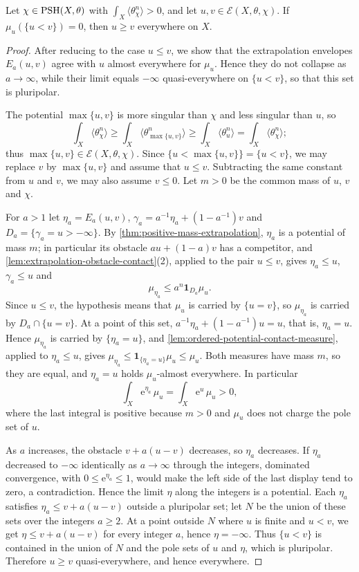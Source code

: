 \begin{theorem}\label{thm:relative-full-mass-domination}
Let $\chi\in\mathrm{PSH}(X,\theta)$ with $\int_X\langle\theta_\chi^n\rangle>0$, and let $u,v\in\mathcal E(X,\theta,\chi)$. If $\mu_u(\{u<v\})=0$, then $u\geq v$ everywhere on $X$.
\end{theorem}
\begin{proof}
After reducing to the case $u\leq v$, we show that the extrapolation envelopes $E_a(u,v)$ agree with $u$ almost everywhere for $\mu_u$. Hence they do not collapse as $a\to\infty$, while their limit equals $-\infty$ quasi-everywhere on $\{u<v\}$, so that this set is pluripolar.

The potential $\max\{u,v\}$ is more singular than $\chi$ and less singular than $u$, so
\[
 \int_X\langle\theta_\chi^n\rangle\geq\int_X\langle\theta_{\max\{u,v\}}^n\rangle
           \geq\int_X\langle\theta_u^n\rangle=\int_X\langle\theta_\chi^n\rangle;
\]
thus $\max\{u,v\}\in\mathcal E(X,\theta,\chi)$. Since $\{u<\max\{u,v\}\}=\{u<v\}$, we may replace $v$ by $\max\{u,v\}$ and assume that $u\leq v$. Subtracting the same constant from $u$ and $v$, we may also assume $v\leq0$. Let $m>0$ be the common mass of $u$, $v$ and $\chi$.

For $a>1$ let $\eta_a=E_a(u,v)$, $\gamma_a=a^{-1}\eta_a+(1-a^{-1})v$ and $D_a=\{\gamma_a=u>-\infty\}$. By \cref{thm:positive-mass-extrapolation}, $\eta_a$ is a potential of mass $m$; in particular its obstacle $au+(1-a)v$ has a competitor, and \cref{lem:extrapolation-obstacle-contact}(2), applied to the pair $u\leq v$, gives $\eta_a\leq u$, $\gamma_a\leq u$ and
\[
 \mu_{\eta_a}\leq a^n\mathbf1_{D_a}\mu_u.
\]
Since $u\leq v$, the hypothesis means that $\mu_u$ is carried by $\{u=v\}$, so $\mu_{\eta_a}$ is carried by $D_a\cap\{u=v\}$. At a point of this set, $a^{-1}\eta_a+(1-a^{-1})u=u$, that is, $\eta_a=u$. Hence $\mu_{\eta_a}$ is carried by $\{\eta_a=u\}$, and \cref{lem:ordered-potential-contact-measure}, applied to $\eta_a\leq u$, gives $\mu_{\eta_a}\leq\mathbf1_{\{\eta_a=u\}}\mu_u\leq\mu_u$. Both measures have mass $m$, so they are equal, and $\eta_a=u$ holds $\mu_u$-almost everywhere. In particular
\[
 \int_X\mathrm e^{\eta_a}\,\mu_u
        =\int_X\mathrm e^u\,\mu_u>0,
\]
where the last integral is positive because $m>0$ and $\mu_u$ does not charge the pole set of $u$.

As $a$ increases, the obstacle $v+a(u-v)$ decreases, so $\eta_a$ decreases. If $\eta_a$ decreased to $-\infty$ identically as $a\to\infty$ through the integers, dominated convergence, with $0\leq\mathrm e^{\eta_a}\leq1$, would make the left side of the last display tend to zero, a contradiction. Hence the limit $\eta$ along the integers is a potential. Each $\eta_a$ satisfies $\eta_a\leq v+a(u-v)$ outside a pluripolar set; let $N$ be the union of these sets over the integers $a\geq2$. At a point outside $N$ where $u$ is finite and $u<v$, we get $\eta\leq v+a(u-v)$ for every integer $a$, hence $\eta=-\infty$. Thus $\{u<v\}$ is contained in the union of $N$ and the pole sets of $u$ and $\eta$, which is pluripolar. Therefore $u\geq v$ quasi-everywhere, and hence everywhere.
\end{proof}

